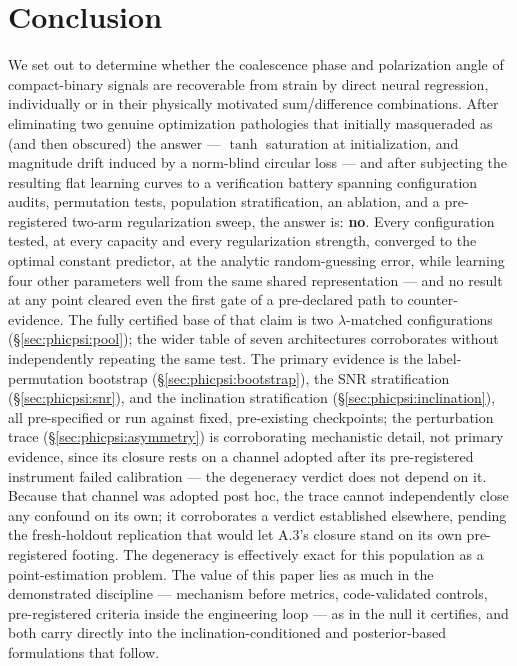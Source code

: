 \documentclass[11pt]{article}
\begin{document}
\section{Conclusion}
\label{sec:phicpsi:conclusion}

We set out to determine whether the coalescence phase and polarization angle of compact-binary signals are recoverable from strain by direct neural regression, individually or in their physically motivated sum/difference combinations.
After eliminating two genuine optimization pathologies that initially masqueraded as (and then obscured) the answer --- $\tanh$ saturation at initialization, and magnitude drift induced by a norm-blind circular loss --- and after subjecting the resulting flat learning curves to a verification battery spanning configuration audits, permutation tests, population stratification, an ablation, and a pre-registered two-arm regularization sweep, the answer is: \textbf{no}.
Every configuration tested, at every capacity and every regularization strength, converged to the optimal constant predictor, at the analytic random-guessing error, while learning four other parameters well from the same shared representation --- and no result at any point cleared even the first gate of a pre-declared path to counter-evidence.
The fully certified base of that claim is two $\lambda$-matched configurations (\S\ref{sec:phicpsi:pool}); the wider table of seven architectures corroborates without independently repeating the same test.
The primary evidence is the label-permutation bootstrap (\S\ref{sec:phicpsi:bootstrap}), the SNR stratification (\S\ref{sec:phicpsi:snr}), and the inclination stratification (\S\ref{sec:phicpsi:inclination}), all pre-specified or run against fixed, pre-existing checkpoints; the perturbation trace (\S\ref{sec:phicpsi:asymmetry}) is corroborating mechanistic detail, not primary evidence, since its closure rests on a channel adopted after its pre-registered instrument failed calibration --- the degeneracy verdict does not depend on it.
Because that channel was adopted post hoc, the trace cannot independently close any confound on its own; it corroborates a verdict established elsewhere, pending the fresh-holdout replication that would let A.3's closure stand on its own pre-registered footing.
The degeneracy is effectively exact for this population as a point-estimation problem.
The value of this paper lies as much in the demonstrated discipline --- mechanism before metrics, code-validated controls, pre-registered criteria inside the engineering loop --- as in the null it certifies, and both carry directly into the inclination-conditioned and posterior-based formulations that follow.
\end{document}

